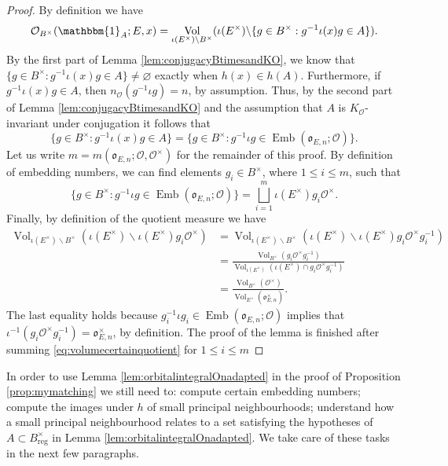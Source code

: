 \documentclass{article}
\theoremstyle{named}
\renewcommand{\O}{\mathcal{O}}
\renewcommand{\o}{\mathfrak{o}}
\DeclareMathOperator{\vol}{Vol}
\DeclareMathOperator{\reg}{reg}
\DeclareMathOperator{\Emb}{Emb}
\begin{document}
\begin{proof}
By definition we have 
\begin{equation*}
    \O_{B^\times}(\mathbbm{1}_A; E, x) = \vol_{\iota(E^\times)\backslash B^\times}(\iota(E^\times)\backslash \{g \in B^\times: g^{-1}\iota(x)g \in A\}).
\end{equation*}
By the first part of Lemma \ref{lem:conjugacyBtimesandKO}, we know that $\{g \in B^\times: g^{-1}\iota(x)g \in A\} \neq \varnothing$ exactly when $h(x) \in h(A)$. Furthermore, if $g^{-1}\iota(x) g \in A$, then $n_\O(g^{-1}\iota g) = n$, by assumption. Thus, by the second part of Lemma \ref{lem:conjugacyBtimesandKO} and the assumption that $A$ is $K_\O$-invariant under conjugation it follows that 
\begin{equation*}
    \{g \in B^\times: g^{-1}\iota(x)g \in A\} = \{g \in B^\times: g^{-1}\iota g \in \Emb(\o_{E, n}; \O)\}.
\end{equation*}
Let us write $m = m(\o_{E, n}; \O, \O^\times)$ for the remainder of this proof. By definition of embedding numbers, we can find elements $g_i \in B^\times$, where $1 \leq i \leq m$, such that 
\begin{equation*}
    \{g \in B^\times: g^{-1}\iota g \in \Emb(\o_{E, n}; \O)\} = \bigsqcup_{i = 1}^{m} \iota(E^\times)g_i \O^\times.
\end{equation*}
Finally, by definition of the quotient measure we have 
\begin{equation}\label{eq:volumecertainquotient}
\begin{aligned}
\vol_{\iota(E^\times)\backslash B^\times}(\iota(E^\times)\backslash \iota(E^\times)g_i \O^\times) & = \vol_{\iota(E^\times)\backslash B^\times}(\iota(E^\times)\backslash \iota(E^\times)g_i \O^\times g_i^{-1})\\
& = \frac{\vol_{B^\times}(g_i \O^\times g_i^{-1})}{\vol_{\iota(E^\times)}(\iota(E^\times)\cap g_i \O^\times g_i^{-1})}\\
& = \frac{\vol_{B^\times}(\O^\times)}{\vol_{E^\times}(\o_{E, n}^\times)}.
\end{aligned}
\end{equation}
The last equality holds because $g_i^{-1}\iota g_i \in \Emb(\o_{E, n}; \O)$ implies that $\iota^{-1}(g_i \O^\times g_i^{-1}) = \o_{E, n}^\times$, by definition. The proof of the lemma is finished after summing \eqref{eq:volumecertainquotient} for $1 \leq i \leq m$
\end{proof}

In order to use Lemma \ref{lem:orbitalintegralOnadapted} in the proof of Proposition \ref{prop:mymatching} we still need to: compute certain embedding numbers; compute the images under $h$ of small principal neighbourhoods; understand how a small principal neighbourhood relates to a set satisfying the hypotheses of $A \subset B_{\reg}^\times$ in Lemma \ref{lem:orbitalintegralOnadapted}. We take care of these tasks in the next few paragraphs.
\end{document}
